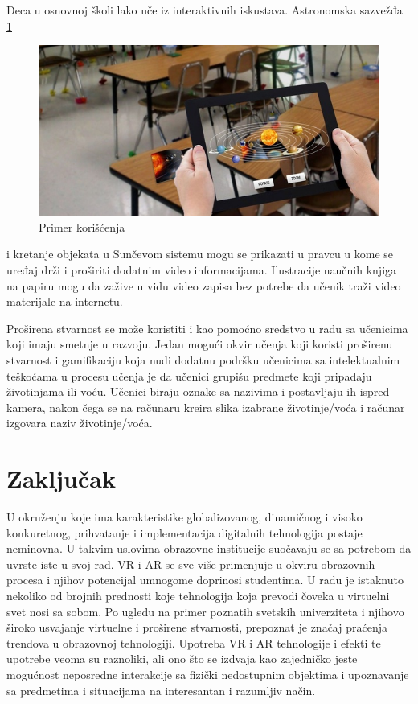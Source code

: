 \documentclass[a4paper]{article}
\begin{document}
	Deca u osnovnoj školi lako uče iz interaktivnih iskustava. Astronomska sazvežđa \ref{fig:Primer korišćenja} 
	\begin{figure}[h!]
		\begin{center}
		\includegraphics[scale=0.5]{primerkorišćenja.jpg}
		\end{center}
		\caption{Primer korišćenja}
		\label{fig:Primer korišćenja}
		\end{figure}
	i kretanje objekata u Sunčevom sistemu mogu se prikazati u pravcu u kome se uređaj drži
	i proširiti dodatnim video informacijama. Ilustracije naučnih knjiga na papiru mogu da zažive u vidu video zapisa bez potrebe da učenik traži video materijale na internetu.

	Proširena stvarnost se može koristiti i kao pomoćno sredstvo u radu sa učenicima koji imaju smetnje u razvoju. Jedan mogući okvir učenja koji koristi proširenu stvarnost 
	i gamifikaciju koja nudi dodatnu podršku učenicima sa intelektualnim teškoćama u procesu učenja je da učenici grupišu predmete koji pripadaju životinjama ili voću. 
	Učenici biraju oznake sa nazivima i postavljaju ih ispred kamera, nakon čega se na računaru kreira slika izabrane životinje/voća i računar izgovara naziv životinje/voća.


	\section{Zaključak}
	\label{sec:Zaključak}
	U okruženju koje ima karakteristike globalizovanog, dinamičnog i visoko  konkuretnog, prihvatanje i implementacija digitalnih 
	tehnologija postaje neminovna. U takvim uslovima obrazovne institucije suočavaju se sa potrebom da uvrste iste u svoj rad. VR i AR se sve više primenjuje
	u okviru obrazovnih procesa i njihov potencijal umnogome doprinosi studentima. U radu je istaknuto nekoliko od brojnih prednosti koje tehnologija koja prevodi
	čoveka u virtuelni svet nosi sa sobom. Po ugledu na primer poznatih svetskih univerziteta i njihovo široko usvajanje virtuelne i proširene stvarnosti, prepoznat 
	je značaj praćenja trendova u obrazovnoj tehnologiji. Upotreba VR i AR tehnologije i efekti te upotrebe veoma su raznoliki, ali ono što se izdvaja kao zajedničko 
	jeste mogućnost neposredne interakcije sa fizički nedostupnim objektima i upoznavanje sa predmetima i situacijama na interesantan i razumljiv način.
	
\end{document}
